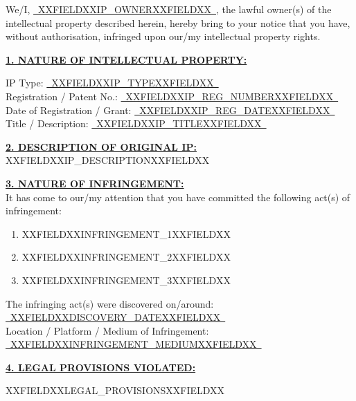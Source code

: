 \documentclass[12pt,a4paper]{article}
\newcommand{\fillline}[1]{\underline{~#1~}}
\begin{document}
\noindent We/I, \fillline{XXFIELDXXIP_OWNERXXFIELDXX}, the lawful owner(s) of the intellectual property
described herein, hereby bring to your notice that you have, without authorisation,
infringed upon our/my intellectual property rights.

\vspace{1em}

\noindent\textbf{\uline{1. NATURE OF INTELLECTUAL PROPERTY:}}

\vspace{0.5em}
\noindent IP Type: \fillline{XXFIELDXXIP_TYPEXXFIELDXX}\\
Registration / Patent No.: \fillline{XXFIELDXXIP_REG_NUMBERXXFIELDXX}\\
Date of Registration / Grant: \fillline{XXFIELDXXIP_REG_DATEXXFIELDXX}\\
Title / Description: \fillline{XXFIELDXXIP_TITLEXXFIELDXX}

\vspace{1em}

\noindent\textbf{\uline{2. DESCRIPTION OF ORIGINAL IP:}}\\
XXFIELDXXIP_DESCRIPTIONXXFIELDXX

\vspace{1em}

\noindent\textbf{\uline{3. NATURE OF INFRINGEMENT:}}\\
It has come to our/my attention that you have committed the following act(s) of infringement:

\begin{enumerate}[label=(\alph*)]
    \item XXFIELDXXINFRINGEMENT_1XXFIELDXX
    \item XXFIELDXXINFRINGEMENT_2XXFIELDXX
    \item XXFIELDXXINFRINGEMENT_3XXFIELDXX
\end{enumerate}

\noindent The infringing act(s) were discovered on/around: \fillline{XXFIELDXXDISCOVERY_DATEXXFIELDXX}\\
\noindent Location / Platform / Medium of Infringement: \fillline{XXFIELDXXINFRINGEMENT_MEDIUMXXFIELDXX}

\vspace{1em}

\noindent\textbf{\uline{4. LEGAL PROVISIONS VIOLATED:}}

\vspace{0.3em}
\noindent XXFIELDXXLEGAL_PROVISIONSXXFIELDXX

\vspace{1em}
\end{document}
